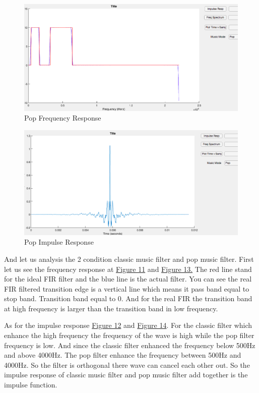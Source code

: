 \documentclass[titlepage]{article}
\begin{document}
\begin{figure}[htbp]
\caption{\label{fig:orgcbffb77}
Pop Frequency Response}
\centering
\includegraphics[width=12cm]{./img/12.png}
\end{figure}

\begin{figure}[htbp]
\caption{\label{fig:orgcf5dc85}
Pop Impulse Response}
\centering
\includegraphics[width=12cm]{./img/13.png}
\end{figure}

And let us analysis the 2 condition classic music filter and pop music filter.
First let us see the frequency response at \hyperref[fig:org74f4b11]{Figure 11} and \hyperref[fig:orgcbffb77]{Figure 13.}
The red line stand for the ideal FIR filter and the blue line is the actual
filter. You can see the real FIR filtered transition edge is a vertical line
which means it pass band equal to stop band. Transition band equal to 0. And
for the real FIR the transition band at high frequency is larger than the
transition band in low frequency.

As for the impulse response \hyperref[fig:org7951797]{Figure 12} and \hyperref[fig:orgcf5dc85]{Figure 14}. For the classic filter
which enhance the high frequency the frequency of the wave is high while the
pop filter frequency is low. And since the classic filter enhanced the
frequency below 500Hz and above 4000Hz. The pop filter enhance the frequency
between 500Hz and 4000Hz. So the filter is orthogonal there wave can cancel
each other out. So the impulse response of classic music filter and pop music
filter add together is the impulse function.
\end{document}
